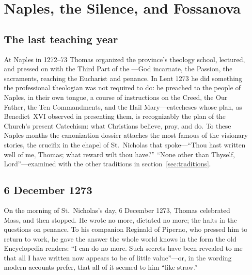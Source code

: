 \section{Naples, the Silence, and Fossanova}

\subsection{The last teaching year}

At Naples in 1272--73 Thomas organized the province's theology school,
lectured, and pressed on with the Third Part of the ---God
incarnate, the Passion, the sacraments, reaching the Eucharist and
penance. In Lent 1273 he did something the professional theologian was
not required to do: he preached to the people of Naples, in their own
tongue, a course of instructions on the Creed, the Our Father, the Ten
Commandments, and the Hail Mary---catecheses whose plan, as
Benedict~XVI observed in presenting them, is recognizably the plan of
the Church's present Catechism: what Christians believe, pray, and do.
To these Naples months the canonization dossier attaches the most famous
of the visionary stories, the crucifix in the chapel of St.~Nicholas
that spoke---``Thou hast written well of me, Thomas; what reward wilt
thou have?'' ``None other than Thyself, Lord''---examined with the other
traditions in section~\ref{sec:traditions}.

\subsection{6 December 1273}

On the morning of St.~Nicholas's day, 6 December 1273, Thomas celebrated
Mass, and then stopped. He wrote no more, dictated no more; the
 halts in the questions on penance. To his companion
Reginald of Piperno, who pressed him to return to work, he gave the
answer the whole world knows in the form the old Encyclopedia renders:
``I can do no more. Such secrets have been revealed to me that all I
have written now appears to be of little value''---or, in the wording
modern accounts prefer, that all of it seemed to him ``like straw.''

